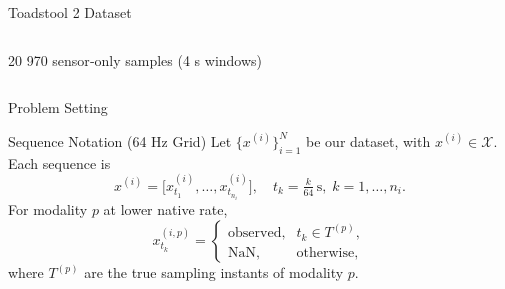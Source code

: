 \begin{frame}{Toadstool 2 Dataset}
\begin{columns}[T]
\begin{column}{0.5\textwidth}
		\begin{block}{}
			20 970 sensor‐only samples (4 s windows)
		\end{block}

		\end{column}
		
	\end{columns}
\end{frame}


\begin{frame}[t]{Problem Setting}

	\begin{block}{Sequence Notation (64 Hz Grid)}
		Let $\{x^{(i)}\}_{i=1}^{N}$ be our dataset, with $x^{(i)}\in\mathcal{X}$.  Each sequence is
		\[
		x^{(i)}
		=\bigl[x^{(i)}_{t_{1}},\dots,x^{(i)}_{t_{n_i}}\bigr],
		\quad t_k = \tfrac{k}{64}\,\mathrm{s},\;k=1,\dots,n_i.
		\]
		For modality $p$ at lower native rate,
		\[
		x^{(i,p)}_{t_k} =
		\begin{cases}
			\text{observed}, & t_k\in T^{(p)},\\
			\mathrm{NaN},    & \text{otherwise},
		\end{cases}
		\]
		where $T^{(p)}$ are the true sampling instants of modality $p$.
	\end{block}
\end{frame}
